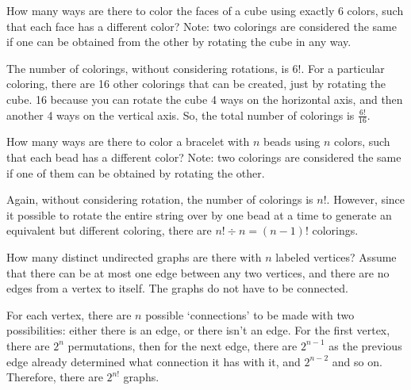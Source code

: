 \documentclass[11pt]{article}
\begin{document}
\begin{Parts}

    \Part How many ways are there to color the faces of a cube using exactly $6$ colors, such that each face has a different color? Note: two colorings are considered the same if one can be obtained from the other by rotating the cube in any way.
    
    \begin{solution}
        The number of colorings, without considering rotations, is $6!$. For a
        particular coloring, there are 16 other colorings that can be created,
        just by rotating the cube. 16 because you can rotate the cube 4 ways
        on the horizontal axis, and then another 4 ways on the vertical axis.
        So, the total number of colorings is $\frac{6!}{16}$.
    \end{solution}

    \Part How many ways are there to color a bracelet with $n$ beads using $n$ colors, such that each bead has a different color? Note: two colorings are considered the same if one of them can be obtained by rotating the other.
    
    \begin{solution}
        Again, without considering rotation, the number of colorings is $n!$.
        However, since it possible to rotate the entire string over by one bead
        at a time to generate an equivalent but different coloring, there are $n!
        \div n = (n-1)!$ colorings.
    \end{solution}

    \Part How many distinct undirected graphs are there with $n$ labeled vertices? Assume that there can be at most one edge between any two vertices, and there are no edges from a vertex to itself. The graphs do not have to be connected.
    
    \begin{solution}
        For each vertex, there are $n$ possible `connections' to be made with two
        possibilities: either there is an edge, or there isn't an edge. For the 
        first vertex, there are $2^n$ permutations, then for the next edge, there
        are $2^{n-1}$ as the previous edge already determined what connection it has 
        with it, and $2^{n-2}$ and so on. Therefore, there are $2^{n!}$ graphs.
    \end{solution}


\end{Parts}
\end{document}
